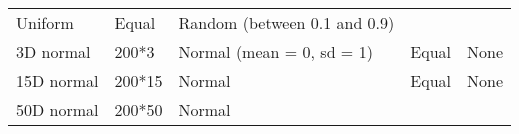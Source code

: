 \documentclass[]{article}
\begin{document}
\begin{longtable}[]{@{}lllll@{}}
\begin{minipage}[t]{0.31\columnwidth}
Uniform\strut
\end{minipage} & \begin{minipage}[t]{0.21\columnwidth}\raggedright\strut
Equal\strut
\end{minipage} & \begin{minipage}[t]{0.13\columnwidth}\raggedright\strut
Random (between 0.1 and 0.9)\strut
\end{minipage}\tabularnewline
\begin{minipage}[t]{0.12\columnwidth}\raggedright\strut
3D normal\strut
\end{minipage} & \begin{minipage}[t]{0.12333\columnwidth}\raggedright\strut
200*3\strut
\end{minipage} & \begin{minipage}[t]{0.31\columnwidth}\raggedright\strut
Normal (mean = 0, sd = 1)\strut
\end{minipage} & \begin{minipage}[t]{0.21\columnwidth}\raggedright\strut
Equal\strut
\end{minipage} & \begin{minipage}[t]{0.13\columnwidth}\raggedright\strut
None\strut
\end{minipage}\tabularnewline
\begin{minipage}[t]{0.12\columnwidth}\raggedright\strut
15D normal\strut
\end{minipage} & \begin{minipage}[t]{0.12333\columnwidth}\raggedright\strut
200*15\strut
\end{minipage} & \begin{minipage}[t]{0.31\columnwidth}\raggedright\strut
Normal\strut
\end{minipage} & \begin{minipage}[t]{0.21\columnwidth}\raggedright\strut
Equal\strut
\end{minipage} & \begin{minipage}[t]{0.13\columnwidth}\raggedright\strut
None\strut
\end{minipage}\tabularnewline
\begin{minipage}[t]{0.12\columnwidth}\raggedright\strut
50D normal\strut
\end{minipage} & \begin{minipage}[t]{0.12333\columnwidth}\raggedright\strut
200*50\strut
\end{minipage} & \begin{minipage}[t]{0.31\columnwidth}\raggedright\strut
Normal\strut
\end{minipage} & \begin{minipage}[t]{0.21\columnwidth}\raggedright\strut

\end{minipage}
\end{longtable}
\end{document}

